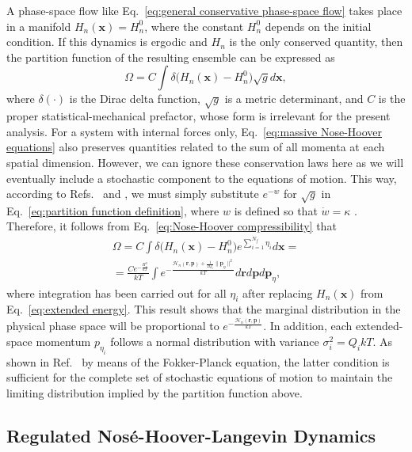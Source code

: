 \documentclass[
aip,
jcp,
reprint,
]{revtex4-1}
\newcommand{\vt}[1]{\boldsymbol{\mathbf{#1}}}          %
\newcommand{\nn}{n}
\begin{document}
A phase-space flow like Eq.~\eqref{eq:general conservative phase-space flow} takes place in a manifold $H_\nn(\vt x) = H_\nn^0$, where the constant $H_\nn^0$ depends on the initial condition.
If this dynamics is ergodic and $H_\nn$ is the only conserved quantity, then the partition function of the resulting ensemble can be expressed as \cite{Tuckerman_1999, Tuckerman_2001a}
\begin{equation}
\label{eq:partition function definition}
\Omega = C \int \delta\Big(H_\nn(\vt x) - H_\nn^0\Big) \sqrt{g} d{\vt x},
\end{equation}
where $\delta(\cdot)$ is the Dirac delta function,
$\sqrt{g}$ is a metric determinant, and
$C$ is the proper statistical-mechanical prefactor, whose form is irrelevant for the present analysis.
For a system with internal forces only, Eq.~\eqref{eq:massive Nose-Hoover equations} also preserves quantities related to the sum of all momenta at each spatial dimension.
However, we can ignore these conservation laws here as we will eventually include a stochastic component to the equations of motion.
This way, according to Refs.~ and , we must simply substitute $e^{-w}$ for $\sqrt{g}$ in Eq.~\eqref{eq:partition function definition}, where $w$ is defined so that $\dot{w} = \kappa$ \cite{Tuckerman_1999, Tuckerman_2001a}.
Therefore, it follows from Eq.~\eqref{eq:Nose-Hoover compressibility} that
\begin{multline}
\label{eq:partition function result}
\Omega = C \int \delta\Big(H_\nn(\vt x) - H_\nn^0\Big) e^{\sum_{i=1}^{N_f} \eta_i} d{\vt x} = \\
= \frac{C e^{-\frac{H_\nn^0}{kT}}}{kT} \int e^{-\frac{\mathcal{H}_\nn(\vt r, \vt p) + \frac{1}{2 Q_i} \|{\vt p}_\eta\|^2}{kT}} d{\vt r} d{\vt p} d{\vt p}_\eta,
\end{multline}
where integration has been carried out for all $\eta_i$ after replacing $H_\nn(\vt x)$ from Eq.~\eqref{eq:extended energy}.
This result shows that the marginal distribution in the physical phase space will be proportional to $e^{-\frac{\mathcal{H}_\nn(\vt r, \vt p)}{kT}}$.
In addition, each extended-space momentum $p_{\eta_i}$ follows a normal distribution with variance $\sigma_i^2 = Q_i k T$.
As shown in Ref.~ by means of the Fokker-Planck equation, the latter condition is sufficient for the complete set of stochastic equations of motion to maintain the limiting distribution implied by the partition function above.

\subsection{Regulated Nos\'{e}-Hoover-Langevin Dynamics}
\label{sec:regulated massive NHL thermostatting}
\end{document}
